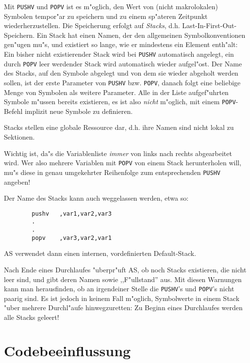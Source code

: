 \documentclass[12pt,a4paper,twoside]{report}
\newcommand{\tty}[1]{{\tt #1}}
\begin{document}
Mit \tty{PUSHV} und \tty{POPV} ist es m"oglich, den Wert von (nicht
makrolokalen) Symbolen tempor"ar zu speichern und zu einem sp"ateren 
Zeitpunkt wiederherzustellen.  Die Speicherung erfolgt auf {\em Stacks},
d.h. Last-In-First-Out-Speichern.  Ein Stack hat einen Namen, der den
allgemeinen Symbolkonventionen gen"ugen mu"s, und existiert so lange,
wie er mindestens ein Element enth"alt: Ein bisher nicht existierender
Stack wird bei \tty{PUSHV} automatisch angelegt, ein durch \tty{POPV} leer
werdender Stack wird automatisch wieder aufgel"ost.  Der Name des Stacks,
auf den Symbole abgelegt und von dem sie wieder abgeholt werden sollen,
ist der erste Parameter von \tty{PUSHV} bzw. \tty{POPV}, danach folgt
eine beliebige Menge von Symbolen als weitere Parameter.  Alle in der
Liste aufgef"uhrten Symbole m"ussen bereits existieren, es ist also 
{\em nicht} m"oglich, mit einem \tty{POPV}-Befehl implizit neue Symbole
zu definieren.  
\par
Stacks stellen eine globale Ressource dar, d.h. ihre Namen sind
nicht lokal zu Sektionen.
\par
Wichtig ist, da"s die Variablenliste {\em immer} von links nach rechts
abgearbeitet wird.  Wer also mehrere Variablen mit \tty{POPV} von einem
Stack herunterholen will, mu"s diese in genau umgekehrter Reihenfolge
zum entsprechenden \tty{PUSHV} angeben!
\par
Der Name des Stacks kann auch weggelassen werden, etwa so:
\begin{verbatim}
        pushv   ,var1,var2,var3
        .
        .
        popv    ,var3,var2,var1
\end{verbatim}
AS verwendet dann einen internen, vordefinierten Default-Stack.
\par
Nach Ende eines Durchlaufes "uberpr"uft AS, ob noch Stacks existieren,
die nicht leer sind, und gibt deren Namen sowie ,,F"ullstand'' aus.  Mit
diesen Warnungen kann man herausfinden, ob an irgendeiner Stelle die
\tty{PUSHV}'s und \tty{POPV}'s nicht paarig sind.  Es ist jedoch in
keinem Fall m"oglich, Symbolwerte in einem Stack "uber mehrere Durchl"aufe
hinwegzuretten: Zu Beginn eines Durchlaufes werden alle Stacks geleert!


\section{Codebeeinflussung}
\end{document}
